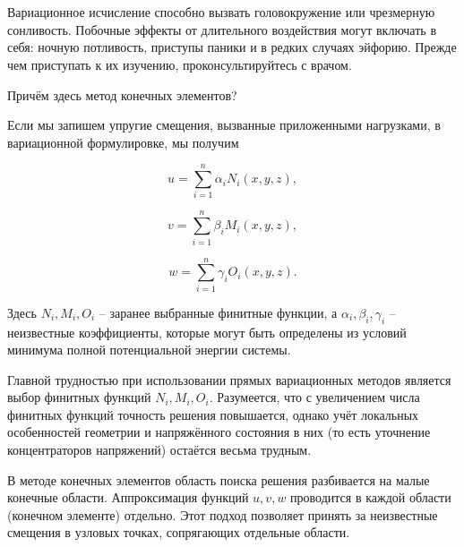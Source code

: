 \newpage
\section{}\label{appendix_d}

\begin{warn}[ВНИМАНИЕ!]
	Вариационное исчисление способно вызвать головокружение или чрезмерную сонливость. Побочные эффекты от длительного воздействия могут включать в себя: ночную потливость, приступы паники и в редких случаях эйфорию. Прежде чем приступать к их изучению, проконсультируйтесь с врачом.
\end{warn}

\begin{question}
	Причём здесь метод конечных элементов?
\end{question}

Если мы запишем упругие смещения, вызванные приложенными нагрузками, в вариационной формулировке, мы получим

\begin{displaymath}
	u = \sum_{i=1}^n  \alpha_{i} N_{i}(x, y, z),
\end{displaymath}

\begin{displaymath}
	v = \sum_{i=1}^n  \beta_{i} M_{i}(x, y, z),
\end{displaymath}

\begin{displaymath}
	w = \sum_{i=1}^n  \gamma_{i} O_{i}(x, y, z).
\end{displaymath}

\noindent Здесь $N_{i}, M_{i}, O_{i}$ -- заранее выбранные финитные функции, а $\alpha_{i}, \beta_{i}, \gamma_{i}$ -- неизвестные коэффициенты, которые могут быть определены из условий минимума полной потенциальной энергии системы.

Главной трудностью при использовании прямых вариационных методов является выбор финитных функций $N_{i}, M_{i}, O_{i}$. 
Разумеется, что с увеличением числа финитных функций точность решения повышается, однако учёт локальных особенностей геометрии и напряжённого состояния в них (то есть уточнение концентраторов напряжений) остаётся весьма трудным.

В методе конечных элементов область поиска решения разбивается на малые конечные области. Аппроксимация функций $u, v, w$ проводится в каждой области (конечном элементе) отдельно. Этот подход позволяет принять за неизвестные смещения в узловых точках, сопрягающих отдельные области.

